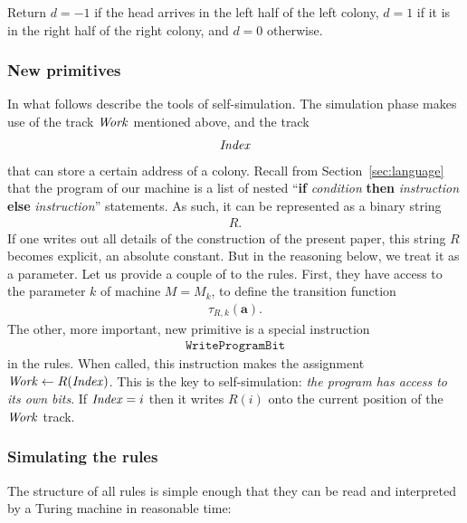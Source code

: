 \documentclass[11pt]{memoir}
\theoremstyle{definition} %
\renewcommand{\vek}[1]{\mathbf{#1}}
\newcommand{\fld}[1]{\ensuremath{\textit{#1\/}}}
\newcommand{\rul}[1]{\ensuremath{\texttt{#1}}}
\newcommand{\va}{\vek{a}} %
\newcommand{\Index}{\fld{Index}}
\newcommand{\Work}{\fld{Work}} %
\newcommand{\WriteProgramBit}{\rul{WriteProgramBit}}
\begin{document}
Return \( d=-1 \) if the head arrives in the left half of the left colony, 
\( d=1 \) if it is in the right half of the right colony,
and \( d=0 \) otherwise.

\subsubsection{New primitives}

In what follows describe the tools of self-simulation.
The simulation phase makes use of the track \( \Work \) mentioned above, and the track
\begin{align*}
   \Index
 \end{align*}
that can store a certain address of a colony.
Recall from Section~\ref{sec:language} that the program
of our machine is a list of nested
``\textbf{if} \emph{condition} \textbf{then} \emph{instruction}
\textbf{else} \emph{instruction}''
statements.
As such, it can be represented as a binary string 
 \begin{align*}
   R.
 \end{align*}
If one writes out all details of the construction of the present paper, this string \( R \)
becomes explicit, an absolute constant.
But in the reasoning below, we treat it as a parameter.
Let us provide a couple of  to the rules.
First, they have access to the parameter \( k \) of machine \( M=M_{k} \), 
to define the transition function
 \begin{align*}
            \tau_{R,k}(\va).
 \end{align*}
The other, more important, new primitive is a special instruction
 \begin{align*}
   \WriteProgramBit
 \end{align*}
in the rules.
When called, this instruction makes the assignment \( \Work\gets R(\Index) \).
This is the key to self-simulation: \emph{the program has
access to its own bits}.
If \( \Index=i \) then it writes \( R(i) \) onto the current position of the \( \Work \) track.


\subsubsection{Simulating the rules}

The structure of all rules is simple enough that they can be read and
interpreted by a Turing machine in reasonable time:
\end{document}
